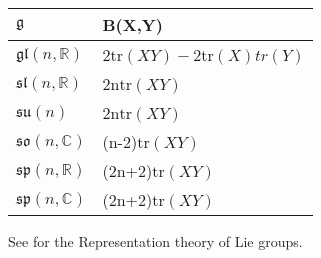 \begin{table}
    \begin{tabular}{|l|l|}
        \hline
          $\mathfrak{g}$              & B(X,Y)                                  \\ \hline
        $\mathfrak{gl}(n,\mathbb{R})$ & 2$\mathrm{tr}(XY) - 2\mathrm{tr}(X)tr(Y)$ \\ 
        $\mathfrak{sl}(n,\mathbb{R})$ & 2n$\mathrm{tr}(XY)$                       \\ 
        $\mathfrak{su}(n)$            & 2n$\mathrm{tr}(XY)$                       \\ 
        $\mathfrak{so}(n,\mathbb{C})$ & (n-2)$\mathrm{tr}(XY)$                    \\ 
        $\mathfrak{sp}(n,\mathbb{R})$ & (2n+2)$\mathrm{tr}(XY)$                   \\ 
        $\mathfrak{sp}(n,\mathbb{C})$ & (2n+2)$\mathrm{tr}(XY)$                   \\
        \hline
    \end{tabular}
\end{table}
See \cite{fulton_representation_1991} for the Representation theory of Lie groups.
